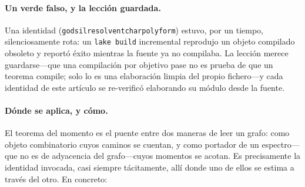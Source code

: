 \documentclass[11pt]{article}
\newcommand{\lean}[1]{{\def\_{\textunderscore\allowbreak}\texttt{#1}}}
\begin{document}
\paragraph{Un verde falso, y la lecci\'on guardada.} Una identidad
(\lean{godsil\_resolvent\_charpoly\_form}) estuvo, por un tiempo, silenciosamente rota: un
\lean{lake build} incremental reprodujo un objeto compilado obsoleto y report\'o \'exito mientras la
fuente ya no compilaba. La lecci\'on merece guardarse---que una compilaci\'on por objetivo pase no es
prueba de que un teorema compile; solo lo es una elaboraci\'on limpia del propio fichero---y cada
identidad de este art\'iculo se re-verific\'o elaborando su m\'odulo desde la fuente.

\paragraph{D\'onde se aplica, y c\'omo.} El teorema del momento es el puente entre dos maneras de leer
un grafo: como objeto combinatorio cuyos caminos se cuentan, y como portador de un espectro---que no
es de adyacencia del grafo---cuyos momentos se acotan. Es precisamente la identidad invocada, casi siempre t\'acitamente, all\'i
donde uno de ellos se estima a trav\'es del otro. En concreto:
\end{document}
